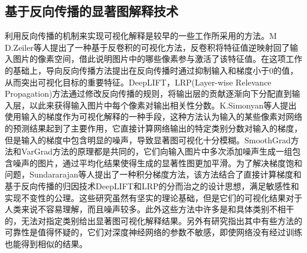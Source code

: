 \subsection{基于反向传播的显著图解释技术}
利用反向传播的机制来实现可视化解释是较早的一些工作所采用的方法。M D.Zeiler等人\textsuperscript{\cite{zeiler2014visualizing}}提出了一种基于反卷积的可视化方法，反卷积将特征值逆映射回了输入图片的像素空间，借此说明图片中的哪些像素参与激活了该特征值。在这项工作的基础上，导向反向传播方法\textsuperscript{\cite{springenberg2014striving}}提出在反向传播时通过抑制输入和梯度小于0的值，从而突出可视化目标的重要特征。DeepLIFT\textsuperscript{\cite{shrikumar2017learning}}，LRP(Layer-wise Relevance Propagation)\textsuperscript{\cite{binder2016layer}}方法通过修改反向传播的规则，将输出层的贡献逐渐向下分配直到输入层，以此来获得输入图片中每个像素对输出相关性分数。K.Simonyan等人\textsuperscript{\cite{simonyan2014deep}}提出使用输入的梯度作为可视化解释的一种手段，这种方法认为输入的某些像素对网络的预测结果起到了主要作用，它直接计算网络输出的特定类别分数对输入的梯度，但是输入的梯度中包含明显的噪声，导致显著图可视化十分模糊。SmoothGrad方法\textsuperscript{\cite{smilkov2017smoothgrad}}和VarGrad方法\textsuperscript{\cite{adebayo2018local}}的原理都是共同的，它们向输入图片中多次添加噪声生成一组包含噪声的图片，通过平均化结果使得生成的显著性图更加平滑。为了解决梯度饱和问题，Sundararajan等人提出了一种积分梯度方法\textsuperscript{\cite{sundararajan2017axiomatic}}，该方法结合了直接计算梯度和基于反向传播的归因技术DeepLIFT和LRP的分而治之的设计思想，满足敏感性和实现不变性的公理。这些研究虽然有坚实的理论基础，但是它们的可视化结果对于人类来说不容易理解，而且噪声较多。此外这些方法中许多是和具体类别不相干的，无法对指定类别给出显著图可视化解释结果。另外有研究\textsuperscript{\cite{adebayo2018sanity}}指出其中有些方法的可靠性是值得怀疑的，它们对深度神经网络的参数不敏感，即使网络没有经过训练也能得到相似的结果。


